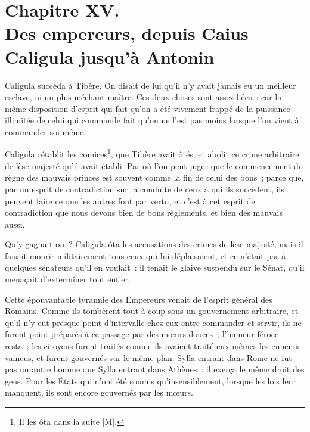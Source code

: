 \documentclass[french,twoside]{book} %
\newcommand\chapteropen{} %
\newcommand\chaptercont{} %
\begin{document}
\chapteropen
\chapter[{Chapitre XV. Des empereurs, depuis Caius Caligula jusqu’à Antonin}]{Chapitre XV. \\
Des empereurs, depuis Caius Caligula jusqu’à Antonin}
\label{considérations\_Romains\_chap\_15}\renewcommand{\leftmark}{Chapitre XV. \\
Des empereurs, depuis Caius Caligula jusqu’à Antonin}


\chaptercont
\noindent Caligula succéda à Tibère. On disait de lui qu’il n’y avait jamais eu un meilleur esclave, ni un plus méchant maître. Ces deux choses sont assez liées : car la même disposition d’esprit qui fait qu’on a été vivement frappé de la puissance illimitée de celui qui commande fait qu’on ne l’est pas moins lorsque l’on vient à commander soi-même.\par
Caligula rétablit les comices\footnote{Il les ôta dans la suite [M].}, que Tibère avait ôtés, et abolit ce crime arbitraire de lèse-majesté qu’il avait établi. Par où l’on peut juger que le commencement du règne des mauvais princes est souvent comme la fin de celui des bons ; parce que, par un esprit de contradiction sur la conduite de ceux à qui ils succèdent, ils peuvent faire ce que les autres font par vertu, et c’est à cet esprit de contradiction que nous devons bien de bons règlements, et bien des mauvais aussi.\par
Qu’y gagna-t-on ? Caligula ôta les accusations des crimes de lèse-majesté, mais il faisait mourir militairement tous ceux qui lui déplaisaient, et ce n’était pas à quelques sénateurs qu’il en voulait : il tenait le glaive suspendu sur le Sénat, qu’il menaçait d’exterminer tout entier.\par
Cette épouvantable tyrannie des Empereurs venait de l’esprit général des Romains. Comme ils tombèrent tout à coup sous un gouvernement arbitraire, et qu’il n’y eut presque point d’intervalle chez eux entre commander et servir, ils ne furent point préparés à ce passage par des mœurs douces ; l’humeur féroce resta ; les citoyens furent traités comme ils avaient traité eux-mêmes les ennemis vaincus, et furent gouvernés sur le même plan. Sylla entrant dans Rome ne fut pas un autre homme que Sylla entrant dans Athènes : il exerça le même droit des gens. Pour les États qui n’ont été soumis qu’insensiblement, lorsque les lois leur manquent, ils sont encore gouvernés par les mœurs.\par
\end{document}
